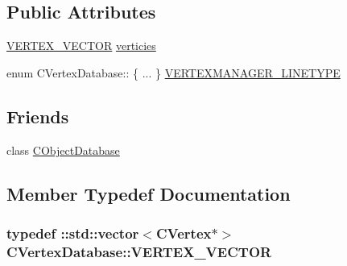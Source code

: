 \subsection*{Public Attributes}
\begin{DoxyCompactItemize}
\item 
\hyperlink{class_c_vertex_database_acb0633bfbb4ada0121b0bc4e523e0f8c}{V\+E\+R\+T\+E\+X\+\_\+\+V\+E\+C\+T\+O\+R} \hyperlink{class_c_vertex_database_a52990ac767f736fd0e91171ad7a9198e}{verticies}
\item 
enum C\+Vertex\+Database\+:: \{ ... \}  \hyperlink{class_c_vertex_database_a1d4566bb0607253a780f530d9e25a1fa}{V\+E\+R\+T\+E\+X\+M\+A\+N\+A\+G\+E\+R\+\_\+\+L\+I\+N\+E\+T\+Y\+P\+E}
\end{DoxyCompactItemize}
\subsection*{Friends}
\begin{DoxyCompactItemize}
\item 
class \hyperlink{class_c_vertex_database_a8451ee9e81bc51a04afb10dc6ee7e07e}{C\+Object\+Database}
\end{DoxyCompactItemize}


\subsection{Member Typedef Documentation}
\hypertarget{class_c_vertex_database_acb0633bfbb4ada0121b0bc4e523e0f8c}{}
\subsubsection[{V\+E\+R\+T\+E\+X\+\_\+\+V\+E\+C\+T\+O\+R}]{\setlength{\rightskip}{0pt plus 5cm}typedef \+::std\+::vector$<${\bf C\+Vertex}$\ast$$>$ {\bf C\+Vertex\+Database\+::\+V\+E\+R\+T\+E\+X\+\_\+\+V\+E\+C\+T\+O\+R}}\label{class_c_vertex_database_acb0633bfbb4ada0121b0bc4e523e0f8c}



